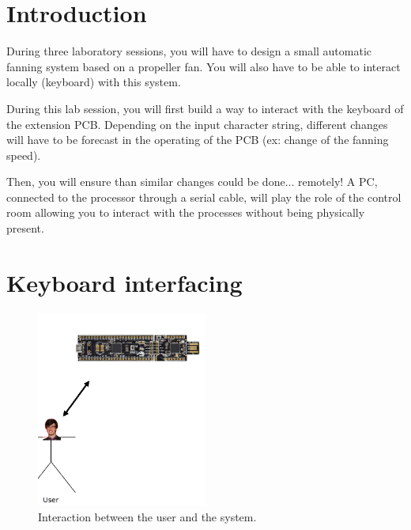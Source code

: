\documentclass[11pt,a4paper]{article}
\theoremstyle{definition}%
\begin{document}
\section{Introduction}
During three laboratory sessions, you will have to design a small automatic fanning system based on a propeller fan.
You will also have to be able to interact locally (keyboard) with this system.

During this lab session, you will first build a way to interact with the keyboard of the extension PCB.
Depending on the input character string, different changes will have to be forecast in the operating of the PCB (ex: change of the fanning speed).

Then, you will ensure than similar changes could be done... remotely!
A PC, connected to the processor through a serial cable, will play the role of the control room allowing you to interact with the processes without being physically present.









\section{Keyboard interfacing}
\begin{figure}[H]
\center
\includegraphics[width=0.5\textwidth]{utilisateur}
\caption{Interaction between the user and the system.}
\label{fig:user}
\end{figure}
\end{document}
